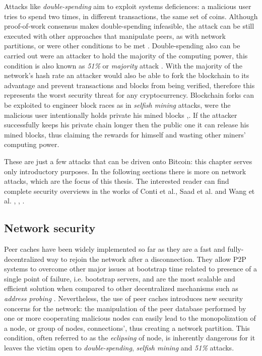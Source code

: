 \documentclass[12pt, letterpaper, twoside]{article}
\begin{document}
Attacks like \textit{double-spending} aim to exploit systems deficiences: a malicious user tries to spend two times, in different transactions, the same set of coins. Although proof-of-work consensus makes double-spending infeasible, the attack can be still executed with other approaches that manipulate peers, as with network partitions, or were other conditions to be met \cite{doublespendfastpay}. Double-spending also can be carried out were an attacker to hold the majority of the computing power, this condition is also known as \textit{51\%} or \textit{majority} attack \cite{51atk}. With the majority of the network's hash rate an attacker would also be able to fork the blockchain to its advantage and prevent transactions and blocks from being verified, therefore this represents the worst security threat for any cryptocurrency. Blockchain forks can be exploited to engineer block races as in \textit{selfish mining} attacks, were the malicious user intentionally holds private his mined blocks \cite{selfishmining},\cite{leelavimolsilp2018selfish}. If the attacker successfully keeps his private chain longer then the public one it can release his mined blocks, thus claiming the rewards for himself and wasting other miners' computing power.

These are just a few attacks that can be driven onto Bitcoin: this chapter serves only introductory purposes. In the following sections there is more on network attacks, which are the focus of this thesis. The interested reader can find complete security overviews in the works of Conti et al., Saad et al. and Wang et al. \cite{completeattacksurvey}, \cite{saad2019attacksurface}, \cite{secpermissionlessblock}.

\subsection{Network security}\label{netsec}
Peer caches have been widely implemented so far as they are a fast and fully-decentralized way to rejoin the network after a disconnection. They allow P2P systems to overcome other major issues at bootstrap time related to presence of a single point of failure, i.e. bootstrap servers, and are the most scalable and efficient solution when compared to other decentralized mechanisms such as \textit{address probing} \cite{decentrbootstrapp2p}.
Nevertheless, the use of peer caches introduces new security concerns for the network:
the manipulation of the peer database performed by one or more cooperating malicious nodes can easily lead to the monopolization of a node, or group of nodes, connections', thus creating a network partition. This condition, often referred to as the \textit{eclipsing} of node, is inherently dangerous for it leaves the victim open to \textit{double-spending}, \textit{selfish mining} and \textit{51\%} attacks.
\end{document}
